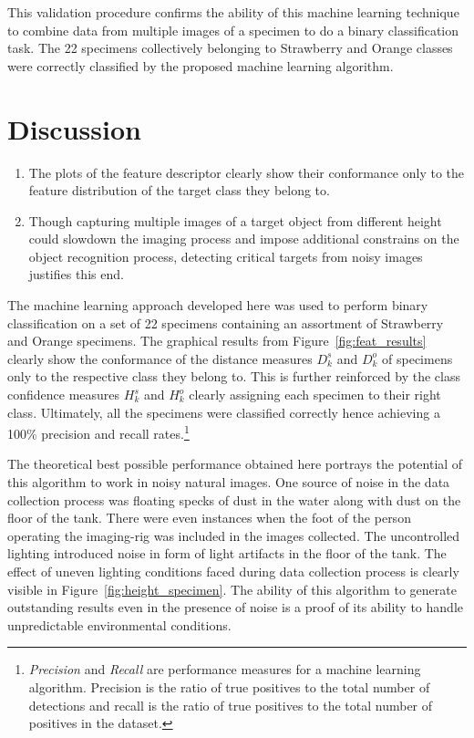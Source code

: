 \documentclass {udthesis}
\begin{document}
This validation procedure confirms the ability of this machine learning technique to combine data from multiple images of a specimen to do a binary classification task. The 22 specimens collectively belonging to Strawberry and Orange classes were correctly classified by the proposed machine learning algorithm.

\section{Discussion}
\begin{enumerate}
	\item The plots of the feature descriptor clearly show their conformance only to the feature distribution of the target class they belong to.
	
	\item Though capturing multiple images of a target object from different height could slowdown the imaging process and impose additional constrains on the object recognition process, detecting critical targets from noisy images justifies this end.
\end{enumerate}

The machine learning approach developed here was used to perform binary classification on a set of 22 specimens containing an assortment of Strawberry and Orange specimens. The graphical results from Figure~\ref{fig:feat_results} clearly show the conformance of the distance measures $D^s_k$ and $D^o_k$ of specimens only to the respective class they belong to. This is further reinforced by the class confidence measures $H^s_k$ and $H^o_k$ clearly assigning each specimen to their right class. Ultimately, all the specimens were classified correctly hence achieving a 100\% precision and recall rates.\footnote{\label{1} \emph{Precision} and \emph{Recall} are performance measures for a machine learning algorithm. Precision is the ratio of true positives to the total number of detections and recall is the ratio of true positives to the total number of positives in the dataset.} 

The theoretical best possible performance obtained here portrays the potential of this algorithm to work in noisy natural images. One source of noise in the data collection process was floating specks of dust in the water along with dust on the floor of the tank. There were even instances when the foot of the person operating the imaging-rig was included in the images collected. The uncontrolled lighting introduced noise in form of light artifacts in the floor of the tank. The effect of uneven lighting conditions faced during data collection process is clearly visible in Figure~\ref{fig:height_specimen}. The ability of this algorithm to generate outstanding results even in the presence of noise is a proof of its ability to handle unpredictable environmental conditions.
\end{document}
